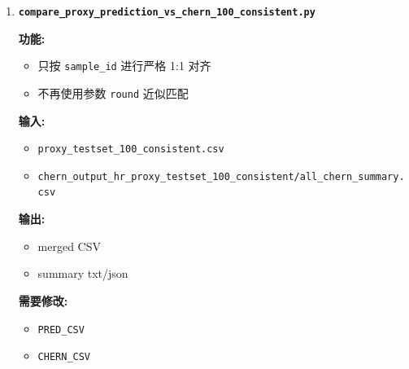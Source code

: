 \documentclass[lang=cn,scheme=chinese,color=blue,device=normal,toc=onecol,math=cm]{elegantbook}
\begin{document}
\begin{enumerate}
\textbf{输出:}\par
 
\begin{itemize}
\item \texttt{scripts/\allowbreak{}raw\_\allowbreak{}hr\_\allowbreak{}proxy\_\allowbreak{}testset\_\allowbreak{}100\_\allowbreak{}consistent/\allowbreak{}}
\end{itemize}
 
\textbf{需要修改:}\par
 
\begin{itemize}
\item \texttt{testCsv}
\item \texttt{rawOutDir}
\item 参数范围(如需)
\end{itemize}
\item \textbf{\texttt{compare\_\allowbreak{}proxy\_\allowbreak{}prediction\_\allowbreak{}vs\_\allowbreak{}chern\_\allowbreak{}100\_\allowbreak{}consistent.py}}\par
 
\textbf{功能:}\par
 
\begin{itemize}
\item 只按 \texttt{sample\_\allowbreak{}id} 进行严格 1:1 对齐
\item 不再使用参数 \texttt{round} 近似匹配
\end{itemize}
 
\textbf{输入:}\par
 
\begin{itemize}
\item \texttt{proxy\_\allowbreak{}testset\_\allowbreak{}100\_\allowbreak{}consistent.csv}
\item \texttt{chern\_\allowbreak{}output\_\allowbreak{}hr\_\allowbreak{}proxy\_\allowbreak{}testset\_\allowbreak{}100\_\allowbreak{}consistent/\allowbreak{}all\_\allowbreak{}chern\_\allowbreak{}summary.csv}
\end{itemize}
 
\textbf{输出:}\par
 
\begin{itemize}
\item merged CSV
\item summary txt/\allowbreak{}json
\end{itemize}
 
\textbf{需要修改:}\par
 
\begin{itemize}
\item \texttt{PRED\_\allowbreak{}CSV}
\item \texttt{CHERN\_\allowbreak{}CSV}
\end{itemize}
\end{enumerate}
\end{document}

